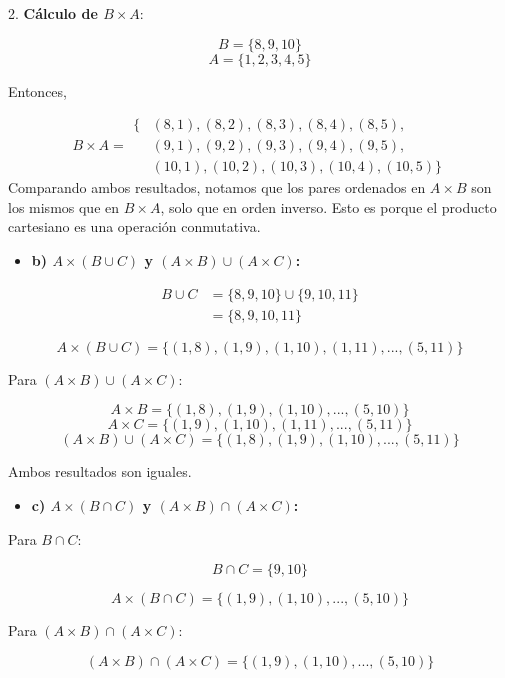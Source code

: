 \documentclass{templateNote}
\begin{document}
2. \textbf{Cálculo de \( B \times A \)}:

\[ B = \{8, 9, 10\} \]
\[ A = \{1, 2, 3, 4, 5\} \]

Entonces,

\[ B \times A = \begin{aligned}
    \{& (8, 1), (8, 2), (8, 3), (8, 4), (8, 5), \\
    & (9, 1), (9, 2), (9, 3), (9, 4), (9, 5), \\
    & (10, 1), (10, 2), (10, 3), (10, 4), (10, 5)\}
    \end{aligned} \]
Comparando ambos resultados, notamos que los pares ordenados en \( A \times B \) son los mismos que en \( B \times A \), solo que en orden inverso. Esto es porque el producto cartesiano es una operación conmutativa.

\begin{itemize}
    \item \textbf{b) \(A \times (B \cup C)\) y \((A \times B) \cup (A \times C)\):}
\end{itemize}

\[
\begin{aligned}
B \cup C &= \{8, 9, 10\} \cup \{9, 10, 11\} \\
&= \{8, 9, 10, 11\}
\end{aligned}
\]

\[ A \times (B \cup C) = \{(1, 8), (1, 9), (1, 10), (1, 11), ..., (5, 11)\} \]

Para \( (A \times B) \cup (A \times C) \):

\[ A \times B = \{(1, 8), (1, 9), (1, 10), ..., (5, 10)\} \]
\[ A \times C = \{(1, 9), (1, 10), (1, 11), ..., (5, 11)\} \]
\[ (A \times B) \cup (A \times C) = \{(1, 8), (1, 9), (1, 10), ..., (5, 11)\} \]

Ambos resultados son iguales.

\begin{itemize}
    \item \textbf{c) \(A \times (B \cap C)\) y \((A \times B) \cap (A \times C)\):}
\end{itemize}

Para \( B \cap C \):

\[ B \cap C = \{9, 10\} \]

\[ A \times (B \cap C) = \{(1, 9), (1, 10), ..., (5, 10)\} \]

Para \( (A \times B) \cap (A \times C) \):

\[ (A \times B) \cap (A \times C) = \{(1, 9), (1, 10), ..., (5, 10)\} \]
\end{document}
